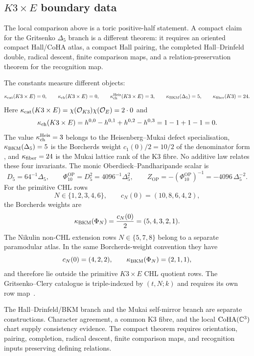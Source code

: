 \subsection{\texorpdfstring{$K3\times E$}{K3 x E} boundary data}
\label{subsec:k3e-boundary-data}

The local comparison above is a toric positive-half statement. A compact claim
for the Gritsenko $\Delta_5$ branch is a different theorem: it requires an
oriented compact Hall/CoHA atlas, a compact Hall pairing, the completed
Hall--Drinfeld double, radical descent, finite comparison maps, and a
relation-preservation theorem for the recognition map.

The constants measure different objects:
\begin{equation}
\label{eq:k3e-four-kappas}
\kappa_{\mathrm{cat}}(K3\times E)=0,\qquad
\kappa_{\mathrm{ch}}(K3\times E)=0,\qquad
\kappa_{\mathrm{ch}}^{\mathrm{Heis}}(K3\times E)=3,\qquad
\kappa_{\mathrm{BKM}}(\Delta_5)=5,\qquad
\kappa_{\mathrm{fiber}}(K3)=24.
\end{equation}
Here $\kappa_{\mathrm{cat}}(K3\times E)=\chi(\mathcal{O}_{K3})\chi(\mathcal{O}_E)=2\cdot 0$ and
\[
\kappa_{\mathrm{ch}}(K3\times E)
=h^{0,0}-h^{0,1}+h^{0,2}-h^{0,3}
=1-1+1-1=0 .
\]
The value $\kappa_{\mathrm{ch}}^{\mathrm{Heis}}=3$ belongs to the Heisenberg--Mukai
defect specialisation, $\kappa_{\mathrm{BKM}}(\Delta_5)=5$ is the Borcherds weight
$c_1(0)/2=10/2$ of the denominator form
\cite{Borcherds1998,Gritsenko1999,GN1998}, and $\kappa_{\mathrm{fiber}}=24$ is the Mukai
lattice rank of the K3 fibre. No additive law relates these four invariants.
The monic Oberdieck--Pandharipande scalar is~\cite{OP2016}
\begin{equation}
\label{eq:D5-normalisation}
D_5=64^{-1}\Delta_5,\qquad
\Phi_{10}^{\mathrm{OP}}=D_5^2=4096^{-1}\Delta_5^2,\qquad
Z_{\mathrm{OP}}=-(\Phi_{10}^{\mathrm{OP}})^{-1}
=-4096\,\Delta_5^{-2}.
\end{equation}
For the primitive CHL rows
\[
N\in\{1,2,3,4,6\},
\qquad
c_N(0)=(10,8,6,4,2),
\]
the Borcherds weights are~\cite{Borcherds1998,Gritsenko1999,GN1998}
\begin{equation}
\label{eq:primitive-chl-kappaBKM}
\kappa_{\mathrm{BKM}}(\Phi_N)=\frac{c_N(0)}{2}=(5,4,3,2,1).
\end{equation}
The Nikulin non-CHL extension rows $N\in\{5,7,8\}$ belong to a separate
paramodular atlas. In the same Borcherds-weight convention they have
\[
c_N(0)=(4,2,2),\qquad
\kappa_{\mathrm{BKM}}(\Phi_N)=(2,1,1),
\]
and therefore lie outside the primitive $K3\times E$ CHL quotient rows. The
Gritsenko--Clery catalogue is triple-indexed by $(t,N;k)$ and requires its own
row map~\cite{CleryGritsenko2011}.

The Hall--Drinfeld/BKM branch and the Mukai self-mirror branch are separate
constructions. Character agreement, a common K3 fibre, and the local
$\mathrm{CoHA}(\mathbb{C}^3)$ chart supply consistency evidence. The compact theorem requires
orientation, pairing, completion, radical descent, finite comparison maps, and
recognition inputs preserving defining relations.

